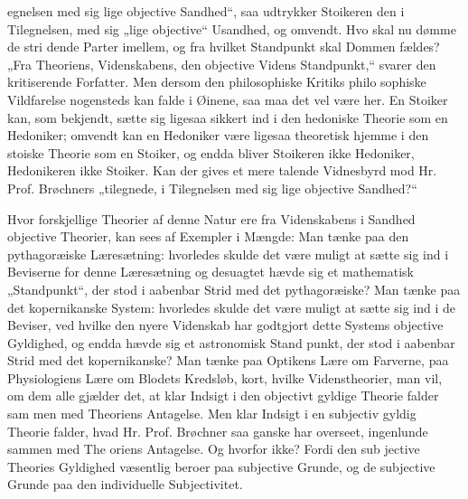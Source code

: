 \documentclass[12pt]{book}
\newcommand{\opage}[1]{\marginnote{\footnotesize\textit{[#1]}}}
\begin{document}
egnelsen med sig lige objective Sandhed“, saa udtrykker
Stoikeren den i Tilegnelsen, med sig „lige objective“ %
Usandhed, og omvendt. Hvo skal nu dømme de stri\-%
dende Parter imellem, og fra hvilket Standpunkt skal
Dommen fældes? „Fra Theoriens, Videnskabens, den
objective Videns Standpunkt,“ svarer den kritiserende
Forfatter. Men dersom den philosophiske Kritiks philo\-%
sophiske Vildfarelse nogensteds kan falde i Øinene, saa
maa det vel være her. En Stoiker kan, som bekjendt,
sætte sig ligesaa sikkert ind i den hedoniske Theorie
som en Hedoniker; omvendt kan en Hedoniker være
ligesaa theoretisk hjemme i den stoiske Theorie som en
Stoiker, og endda bliver Stoikeren ikke Hedoniker,
Hedonikeren ikke Stoiker. Kan der gives et mere
talende Vidnesbyrd mod Hr. Prof. Brøchners „tilegnede,
i Tilegnelsen med sig lige objective Sandhed?“

\opage{14}\setcounter{footnote}{0}%
Hvor forskjellige Theorier af denne Natur ere fra
Videnskabens i Sandhed objective Theorier, kan sees af
Exempler i Mængde: Man tænke paa den pythagoræiske
Læresætning: hvorledes skulde det være muligt at sætte
sig ind i Beviserne for denne Læresætning og desuagtet
hævde sig et mathematisk „Standpunkt“, der stod i
aabenbar Strid med det pythagoræiske? Man tænke paa
det kopernikanske System: hvorledes skulde det være
muligt at sætte sig ind i de Beviser, ved hvilke den
nyere Videnskab har godtgjort dette Systems objective
Gyldighed, og endda hævde sig et astronomisk Stand\-%
punkt, der stod i aabenbar Strid med det kopernikanske?
Man tænke paa Optikens Lære om Farverne, paa
Physiologiens Lære om Blodets Kredsløb, kort, hvilke
Videnstheorier, man vil, om dem alle gjælder det, at
klar Indsigt i den objectivt gyldige Theorie falder sam\-%
men med Theoriens Antagelse. Men klar Indsigt i en
subjectiv gyldig Theorie falder, hvad Hr. Prof. Brøchner
saa ganske har overseet, ingenlunde sammen med The\-%
oriens Antagelse. Og hvorfor ikke? Fordi den sub\-%
jective Theories Gyldighed væsentlig beroer paa subjective
Grunde, og de subjective Grunde paa den individuelle
Subjectivitet.
\end{document}
